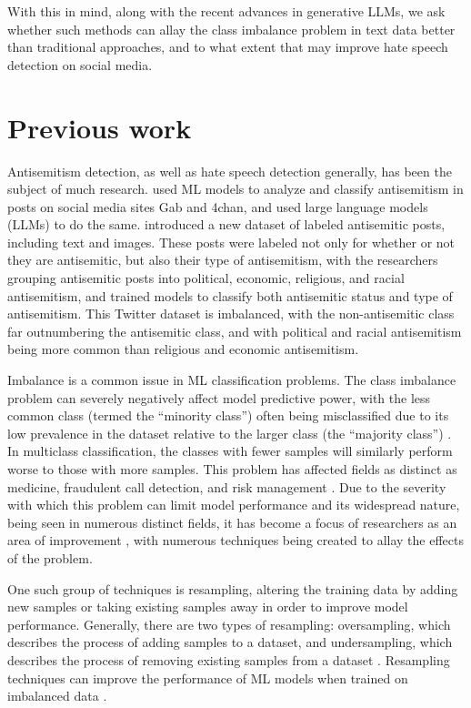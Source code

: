 \documentclass[runningheads]{llncs}
\begin{document}
With this in mind, along with the recent advances in generative LLMs, we ask whether such methods can allay the class imbalance problem in text data better than traditional approaches, and to what extent that may improve hate speech detection on social media.

\section{Previous work}
Antisemitism detection, as well as hate speech detection generally, has been the subject of much research. \cite{martins} used ML models to analyze and classify antisemitism in posts on social media sites Gab and 4chan, and \cite{gonzalez} used large language models (LLMs) to do the same. \cite{chandra} introduced a new dataset of labeled antisemitic posts, including text and images. These posts were labeled not only for whether or not they are antisemitic, but also their type of antisemitism, with the researchers grouping antisemitic posts into political, economic, religious, and racial antisemitism, and trained models to classify both antisemitic status and type of antisemitism. This Twitter dataset is imbalanced, with the non-antisemitic class far outnumbering the antisemitic class, and with political and racial antisemitism being more common than religious and economic antisemitism.

Imbalance is a common issue in ML classification problems. The class imbalance problem can severely negatively affect model predictive power, with the less common class (termed the ``minority class'') often being misclassified due to its low prevalence in the dataset relative to the larger class (the ``majority class'') \cite{abdelrahman}. In multiclass classification, the classes with fewer samples will similarly perform worse to those with more samples. This problem has affected fields as distinct as medicine, fraudulent call detection, and risk management \cite{sun}. Due to the severity with which this problem can limit model performance and its widespread nature, being seen in numerous distinct fields, it has become a focus of researchers as an area of improvement \cite{abdelrahman}, with numerous techniques being created to allay the effects of the problem.

One such group of techniques is resampling, altering the training data by adding new samples or taking existing samples away in order to improve model performance. Generally, there are two types of resampling: oversampling, which describes the process of adding samples to a dataset, and undersampling, which describes the process of removing existing samples from a dataset \cite{shelke}. Resampling techniques can improve the performance of ML models when trained on imbalanced data \cite{lee} \cite{khushi}.
\end{document}
